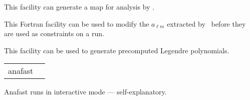 \begin{support}
  \begin{sulist}{} %
  \item[\htmlref{synfast}{fac:synfast}] This \healpix facility can generate a map for analysis by \thedocid.
  \item[\htmlref{alteralm}{fac:alteralm}] This \healpix Fortran facility can be
  used to modify the $a_{\ell m}$ extracted by \thedocid\ before they are used as
  constraints on a  run.
  \item[\htmlref{plmgen}{fac:plmgen}] This \healpix facility can be used to generate precomputed Legendre polynomials.		
  \end{sulist}
\end{support}

\begin{examples}{1}
{
\begin{tabular}{ll} %
anafast  \\
\end{tabular}
}
{
Anafast runs in interactive mode --- self-explanatory.
}
\end{examples}

\vfill\newpage

